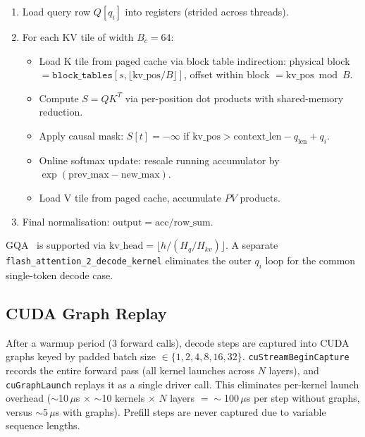 \begin{enumerate}
  \item Load query row $Q[q_i]$ into registers (strided across threads).
  \item For each KV tile of width $B_c = 64$:
        \begin{itemize}
          \item Load K tile from paged cache via block table indirection:
                physical block $= \texttt{block\_tables}[s, \lfloor\text{kv\_pos} / B\rfloor]$,
                offset within block $= \text{kv\_pos} \bmod B$.
          \item Compute $S = QK^T$ via per-position dot products with
                shared-memory reduction.
          \item Apply causal mask: $S[t] = -\infty$ if $\text{kv\_pos} > \text{context\_len} - q_{\text{len}} + q_i$.
          \item Online softmax update: rescale running accumulator by
                $\exp(\text{prev\_max} - \text{new\_max})$.
          \item Load V tile from paged cache, accumulate $PV$ products.
        \end{itemize}
  \item Final normalisation: $\text{output} = \text{acc} / \text{row\_sum}$.
\end{enumerate}

GQA~\cite{ainslie2023gqa} is supported via
$\text{kv\_head} = \lfloor h / (H_q / H_{kv}) \rfloor$.
A separate \texttt{flash\_attention\_2\_decode\_kernel} eliminates the outer
$q_i$ loop for the common single-token decode case.

\subsection{CUDA Graph Replay}

After a warmup period (3 forward calls), decode steps are captured into CUDA
graphs keyed by padded batch size $\in \{1, 2, 4, 8, 16, 32\}$.
\texttt{cuStreamBeginCapture} records the entire forward pass (all kernel launches
across $N$ layers), and \texttt{cuGraphLaunch} replays it as a single driver call.
This eliminates per-kernel launch overhead ($\sim$10\,$\mu$s $\times$ $\sim$10
kernels $\times$ $N$ layers $= \sim$100\,$\mu$s per step without graphs, versus
$\sim$5\,$\mu$s with graphs). Prefill steps are never captured due to variable
sequence lengths.

